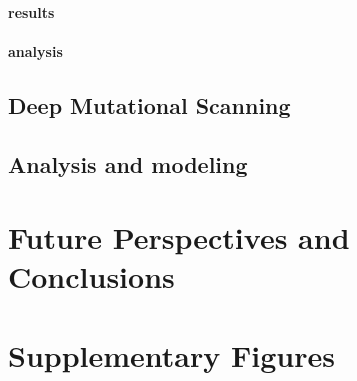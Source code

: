 \documentclass{article}
\newcommand{\beginsupplement}{%
        \setcounter{table}{0}
        \renewcommand{\thetable}{S\arabic{table}}%
        \setcounter{figure}{0}
        \renewcommand{\thefigure}{S\arabic{figure}}%
     }
\begin{document}
\paragraph{results}



\paragraph{analysis}

\subsection*{Deep Mutational Scanning}

\subsection*{Analysis and modeling}

\section*{Future Perspectives and Conclusions}




% 
% 




\section*{Supplementary Figures}

\end{document}
